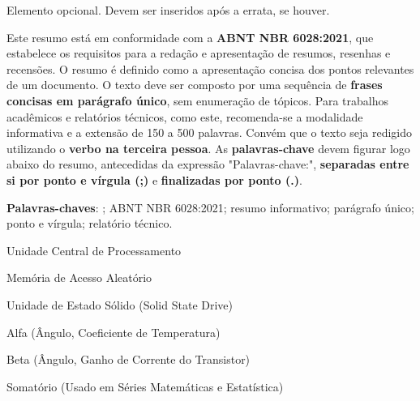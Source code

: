 \documentclass{Arquivos/TrabalhoAcademico}
\begin{document}
\nocite{*}


\pretextual %


\folhaderosto
\contracapa


Elemento opcional. Devem ser inseridos após a errata, se houver.




\begin{resumo}
Este resumo está em conformidade com a \textbf{ABNT NBR 6028:2021}, que estabelece os requisitos para a redação e apresentação de resumos, resenhas e recensões. O resumo é definido como a apresentação concisa dos pontos relevantes de um documento. O texto deve ser composto por uma sequência de \textbf{frases concisas em parágrafo único}, sem enumeração de tópicos. Para trabalhos acadêmicos e relatórios técnicos, como este, recomenda-se a modalidade informativa e a extensão de 150 a 500 palavras. Convém que o texto seja redigido utilizando o \textbf{verbo na terceira pessoa}. As \textbf{palavras-chave} devem figurar logo abaixo do resumo, antecedidas da expressão "Palavras-chave:", \textbf{separadas entre si por ponto e vírgula (;)} e \textbf{finalizadas por ponto (.)}.

\textbf{Palavras-chaves}: \WenesTex; ABNT NBR 6028:2021; resumo informativo; parágrafo único; ponto e vírgula; relatório técnico.
\end{resumo}


\begin{resumoEN}

\end{resumoEN}


\listaDeFiguras
\listaDeTabelas


\begin{siglas}
    \item[CPU] Unidade Central de Processamento
    \item[RAM] Memória de Acesso Aleatório
    \item[SSD] Unidade de Estado Sólido (Solid State Drive)
\end{siglas}


\begin{simbolos}
    \item[$\alpha$] Alfa (Ângulo, Coeficiente de Temperatura)
    \item[$\beta$] Beta (Ângulo, Ganho de Corrente do Transistor)
    \item[$\sum$] Somatório (Usado em Séries Matemáticas e Estatística)
\end{simbolos}
\end{document}
